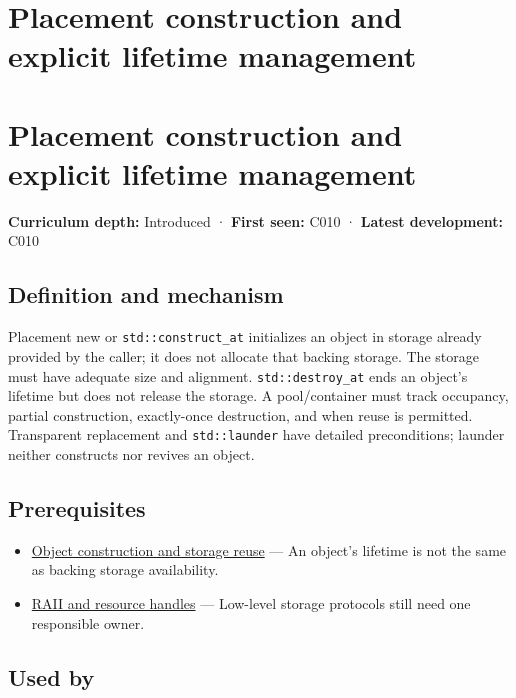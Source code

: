 \hypertarget{appendix-f56c3e43fd4e}{}
\section*{Placement construction and explicit lifetime management}
\section{Placement construction and explicit lifetime management}\label{appendix-f56c3e43fd4e-placement-construction-and-explicit-lifetime-management}

\textbf{Curriculum depth:} Introduced · \textbf{First seen:} C010 · \textbf{Latest development:} C010

\subsection{Definition and mechanism}\label{appendix-f56c3e43fd4e-definition-and-mechanism}

Placement new or \texttt{std::construct\_at} initializes an object in storage already provided by the caller; it does not allocate that backing storage. The storage must have adequate size and alignment. \texttt{std::destroy\_at} ends an object's lifetime but does not release the storage. A pool/container must track occupancy, partial construction, exactly-once destruction, and when reuse is permitted. Transparent replacement and \texttt{std::launder} have detailed preconditions; launder neither constructs nor revives an object.

\subsection{Prerequisites}\label{appendix-f56c3e43fd4e-prerequisites}

\begin{itemize}
\tightlist
\item
  \hyperref[appendix-a82f9c438857]{Object construction and storage reuse} --- An object's lifetime is not the same as backing storage availability.
\item
  \hyperref[appendix-69739d3ab49b]{RAII and resource handles} --- Low-level storage protocols still need one responsible owner.
\end{itemize}

\subsection{Used by}\label{appendix-f56c3e43fd4e-used-by}


